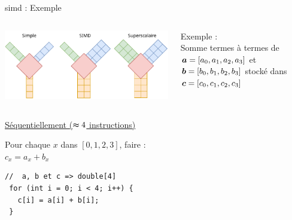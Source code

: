 \documentclass[../main.tex]{subfiles}
\begin{document}
\begin{frame}[fragile]{\acrshort{simd} : Exemple}
  \vspace{- 1 em}
  \begin{columns}
    \begin{column}{.5\linewidth}
      \includegraphics[width=\linewidth]{figures/drawiopdf/testyolo-jm2.pdf}
    \end{column}
    \begin{column}{.5\linewidth}
      Exemple : \\
      \hspace{2 em} \centering Somme termes à termes de $\bm{a} = [a_0, a_1, a_2, a_3]$ et $\bm{b} = [b_0, b_1, b_2, b_3]$ stocké dans $\bm{c} =  [c_0, c_1, c_2, c_3]$ 
    \end{column}
  \end{columns} \vspace{1 em} 

  \begin{columns}
    \begin{column}{.5\linewidth}
      \begin{overlayarea}{\linewidth}{.4\textheight}
        \underline{Séquentiellement ($\thickapprox 4$ instructions)} \vspace{1 em}

        Pour chaque $x$ dans $[0,1,2,3]$, faire :\\
        \hspace{2 em} $c_x = a_x + b_x$

        \begin{lstlisting}[title={Sequentiellement en C},style=cstyle,basicstyle=\scriptsize]
 //  a, b et c => double[4]
 for (int i = 0; i < 4; i++) {
   c[i] = a[i] + b[i]; 
 }\end{lstlisting}


\end{overlayarea}
\end{column}
\end{columns}
\end{frame}
\end{document}
